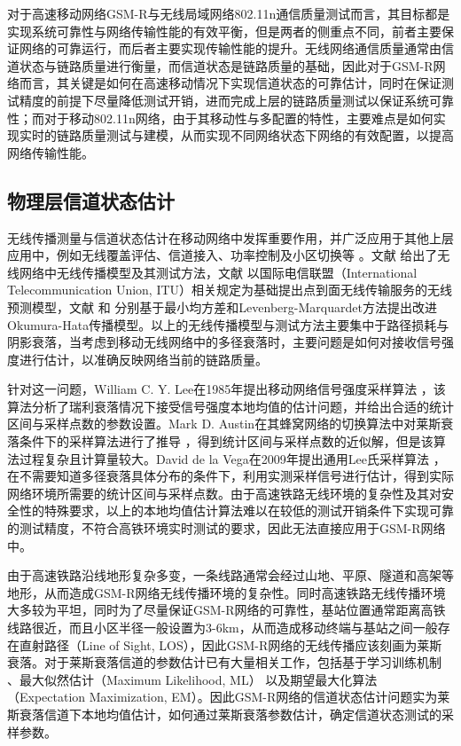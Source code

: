 对于高速移动网络GSM-R与无线局域网络802.11n通信质量测试而言，其目标都是实现系统可靠性与网络传输性能的有效平衡，但是两者的侧重点不同，前者主要保证网络的可靠运行，而后者主要实现传输性能的提升。无线网络通信质量通常由信道状态与链路质量进行衡量，而信道状态是链路质量的基础，因此对于GSM-R网络而言，其关键是如何在高速移动情况下实现信道状态的可靠估计，同时在保证测试精度的前提下尽量降低测试开销，进而完成上层的链路质量测试以保证系统可靠性；而对于移动802.11n网络，由于其移动性与多配置的特性，主要难点是如何实现实时的链路质量测试与建模，从而实现不同网络状态下网络的有效配置，以提高网络传输性能。

\subsection{物理层信道状态估计}
\label{sec:phy}

无线传播测量与信道状态估计在移动网络中发挥重要作用，并广泛应用于其他上层应用中，例如无线覆盖评估、信道接入、功率控制及小区切换等 \cite{Austin1994}\cite{itoh2002performance}\cite{zhang1996analysis}\cite{zhu2005performance}。文献 \cite{andersen1995propagation} \cite{sarkar2003survey} 给出了无线网络中无线传播模型及其测试方法，文献 \cite{Ostlin2008itu} 以国际电信联盟（International Telecommunication Union, ITU）相关规定为基础提出点到面无线传输服务的无线预测模型，文献 \cite{Akhoondzadeh2007modifi} 和 \cite{medeisis2000use} 分别基于最小均方差和Levenberg-Marquardet方法提出改进Okumura-Hata传播模型。以上的无线传播模型与测试方法主要集中于路径损耗与阴影衰落，当考虑到移动无线网络中的多径衰落时，主要问题是如何对接收信号强度进行估计，以准确反映网络当前的链路质量。

针对这一问题，William C. Y. Lee在1985年提出移动网络信号强度采样算法 \cite{lee1985estimate}，该算法分析了瑞利衰落情况下接受信号强度本地均值的估计问题，并给出合适的统计区间与采样点数的参数设置。Mark D. Austin在其蜂窝网络的切换算法中对莱斯衰落条件下的采样算法进行了推导 \cite{Austin1994}，得到统计区间与采样点数的近似解，但是该算法过程复杂且计算量较大。David de la Vega在2009年提出通用Lee氏采样算法 \cite{Vega2009}，在不需要知道多径衰落具体分布的条件下，利用实测采样信号进行估计，得到实际网络环境所需要的统计区间与采样点数。由于高速铁路无线环境的复杂性及其对安全性的特殊要求，以上的本地均值估计算法难以在较低的测试开销条件下实现可靠的测试精度，不符合高铁环境实时测试的要求，因此无法直接应用于GSM-R网络中。

由于高速铁路沿线地形复杂多变，一条线路通常会经过山地、平原、隧道和高架等地形，从而造成GSM-R网络无线传播环境的复杂性。同时高速铁路无线传播环境大多较为平坦，同时为了尽量保证GSM-R网络的可靠性，基站位置通常距离高铁线路很近，而且小区半径一般设置为3-6km，从而造成移动终端与基站之间一般存在直射路径（Line of Sight, LOS），因此GSM-R网络的无线传播应该刻画为莱斯衰落。对于莱斯衰落信道的参数估计已有大量相关工作，包括基于学习训练机制 \cite{bjornson2010framework}、最大似然估计（Maximum Likelihood, ML） \cite{sijbers1998maximum} 以及期望最大化算法（Expectation Maximization, EM）\cite{marzetta1995algorithm}。因此GSM-R网络的信道状态估计问题实为莱斯衰落信道下本地均值估计，如何通过莱斯衰落参数估计，确定信道状态测试的采样参数。

